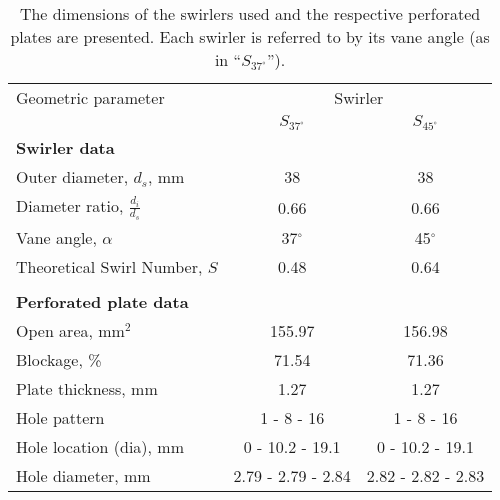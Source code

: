 \begin{table}

\caption[Swirler Dimensions]{The dimensions of the swirlers used and the respective perforated plates are presented. Each swirler is referred to by its vane angle (as in ``\(S_{37^\circ}\)'').}

\begin{center}
\begin{tabular}{lcc}
  Geometric parameter & \multicolumn{2}{c}{Swirler} \tabularnewline
  & \(S_{37^\circ}\) & \(S_{45^\circ}\) \tabularnewline
  \hline \hline
  \textbf{Swirler data} & & \tabularnewline
  Outer diameter, \(d_s\), mm & 38 & 38 \tabularnewline
  Diameter ratio, \(\frac{d_i}{d_s}\) & 0.66 & 0.66 \tabularnewline
  Vane angle, \(\alpha\) & 37\(^\circ\) & 45\(^\circ\) \tabularnewline
  Theoretical Swirl Number, \(S\) & 0.48 & 0.64 \tabularnewline
  & & \tabularnewline
  \textbf{Perforated plate data} & & \tabularnewline
  Open area, mm\(^2\) & 155.97 & 156.98 \tabularnewline
  Blockage, \% & 71.54 & 71.36 \tabularnewline
  Plate thickness, mm & 1.27 & 1.27 \tabularnewline
  Hole pattern & 1 - 8 - 16 & 1 - 8 - 16 \tabularnewline
  Hole location (dia), mm & 0 - 10.2 - 19.1 & 0 - 10.2 - 19.1 \tabularnewline
  Hole diameter, mm & 2.79 - 2.79 - 2.84 & 2.82 - 2.82 - 2.83 \tabularnewline
\end{tabular}
\end{center}

\label{tab:swirlerdimensions}

\end{table}

